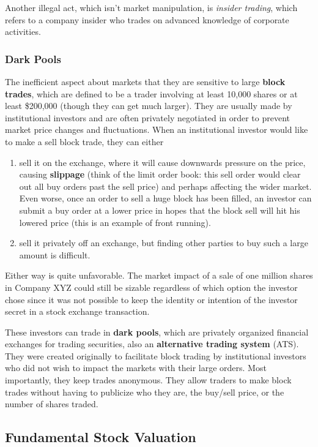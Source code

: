 \documentclass{article}
\begin{document}
Another illegal act, which isn't market manipulation, is \textit{insider trading}, which refers to a company insider who trades on advanced knowledge of corporate activities. 

\subsubsection{Dark Pools}

The inefficient aspect about markets that they are sensitive to large \textbf{block trades}, which are defined to be a trader involving at least 10,000 shares or at least \$200,000 (though they can get much larger). They are usually made by institutional investors and are often privately negotiated in order to prevent market price changes and fluctuations. When an institutional investor would like to make a sell block trade, they can either 
\begin{enumerate}
    \item sell it on the exchange, where it will cause downwards pressure on the price, causing \textbf{slippage} (think of the limit order book: this sell order would clear out all buy orders past the sell price) and perhaps affecting the wider market. Even worse, once an order to sell a huge block has been filled, an investor can submit a buy order at a lower price in hopes that the block sell will hit his lowered price (this is an example of front running). 
    \item sell it privately off an exchange, but finding other parties to buy such a large amount is difficult. 
\end{enumerate}
Either way is quite unfavorable. The market impact of a sale of one million shares in Company XYZ could still be sizable regardless of which option the investor chose since it was not possible to keep the identity or intention of the investor secret in a stock exchange transaction. 

These investors can trade in \textbf{dark pools}, which are privately organized financial exchanges for trading securities, also an \textbf{alternative trading system} (ATS). They were created originally to facilitate block trading by institutional investors who did not wish to impact the markets with their large orders. Most importantly, they keep trades anonymous. They allow traders to make block trades without having to publicize who they are, the buy/sell price, or the number of shares traded. 

\subsection{Fundamental Stock Valuation}
\end{document}
